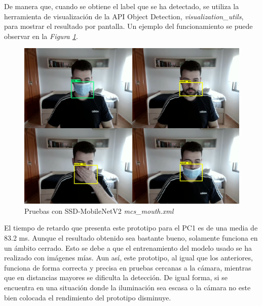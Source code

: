 De manera que, cuando se obtiene el label que se ha detectado, se utiliza la herramienta de visualización de la API Object Detection, \textit{visualization\_utils}, para mostrar el resultado por pantalla. Un ejemplo del funcionamiento se puede observar en la \textit{Figura \ref{fig:protoTensorFlow}}.

\begin{figure}[htp]
	\centering
	\includegraphics[width=12cm]{imagenes/tf_prueba.png}
	\caption{Pruebas con SSD-MobileNetV2 \textit{mcs\_mouth.xml}}
	\label{fig:protoTensorFlow}
\end{figure}

El tiempo de retardo que presenta este prototipo para el PC1 es de una media de 83.2 ms. Aunque el resultado obtenido sea bastante bueno, solamente funciona en un ámbito cerrado. Esto se debe a que el entrenamiento del modelo usado se ha realizado con imágenes mías. Aun así, este prototipo, al igual que los anteriores, funciona de forma correcta y precisa en pruebas cercanas a la cámara, mientras que en distancias mayores se dificulta la detección. De igual forma, si se encuentra en una situación donde la iluminación sea escasa o la cámara no este bien colocada el rendimiento del prototipo disminuye.




